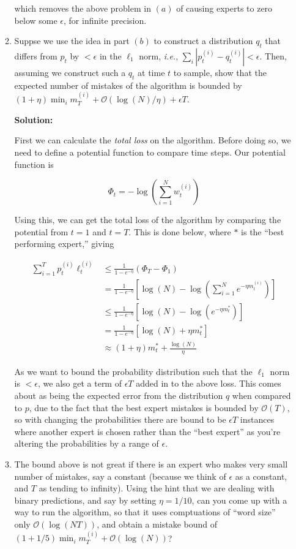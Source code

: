 \documentclass[12pt]{article}
\newcommand{\abs}[1]{\left| #1 \right|}
\newcommand{\BigO}[1]{\mathcal{O}\left( #1 \right)}
\begin{document}
\begin{enumerate}
\begin{enumerate}
which removes the above problem in $(a)$ of causing experts to zero below some $\epsilon$, for infinite precision. 


\item Suppse we use the idea in part $(b)$ to construct a distribution $q_{t}$ that differs from $p_{t}$ by $< \epsilon$ in the $\ell_{1}$ norm, {\em i.e.}, $\sum_{i}\abs{p_{t}^{(i)} - q_{t}^{(i)}} < \epsilon$. Then, assuming we construct such a $q_{t}$ at time $t$ to sample, show that the expected number of mistakes of the algorithm is bounded by $(1 + \eta)\min_{i}m_{T}^{(i)} + \BigO{\log(N)/\eta} + \epsilon T$.

      {\bf Solution:}

First we can calculate the {\em total loss} on the algorithm. Before doing so, we need to define a potential function to compare time steps. Our potential function is

\[
\Phi_{t} = -\log\left(\sum_{i=1}^{N}w_{t}^{(i)} \right) 
\]

Using this, we can get the total loss of the algorithm by comparing the potential from $t=1$ and $t=T$. This is done below, where $*$ is the ``best performing expert,'' giving

\begin{align*}
  \sum_{i=1}^{T} p_{t}^{(i)}\ell_{t}^{(i)} &\leq \frac{1}{1 - e^{-\eta}} \left( \Phi_{T} - \Phi_{1} \right)\\
  &= \frac{1}{1 - e^{-\eta}}\left[ \log(N) - \log\left( \sum_{i=1}^{N}e^{-\eta m_{t}^{(i)}}\right)\right]\\
 &\leq \frac{1}{1 - e^{-\eta}} \left[ \log(N) - \log\left( e^{-\eta m_{t}^{*}}\right)\right]\\
 &= \frac{1}{1 - e^{-\eta}}\left[ \log(N) + \eta m_{t}^{*} \right]\\
 &\approx (1 + \eta)m_{t}^{*} + \frac{\log(N)}{\eta}
\end{align*}

As we want to bound the probability distribution such that the $\ell_{1}$ norm is $< \epsilon$, we also get a term of $\epsilon T$ added in to the above loss. This comes about as being the expected error from the distribution $q$ when compared to $p$, due to the fact that the best expert mistakes is bounded by $\BigO{T}$, so with changing the probabilities there are bound to be $\epsilon T$ instances where another expert is chosen rather than the ``best expert'' as you're altering the probabilities by a range of $\epsilon$.


\item The bound above is not great if there is an expert who makes very small number of mistakes, say a constant (because we think of $\epsilon$ as a constant, and $T$ as tending to infinity). Using the hint that we are dealing with binary predictions, and say by setting $\eta = 1/10$, can you come up with a way to run the algorithm, so that it uses comptuations of ``word size'' only $\BigO{\log(NT)}$, and obtain a mistake bound of $(1 + 1/5)\min_{i} m_{T}^{(i)} + \BigO{\log(N)}$?


\end{enumerate}
\end{enumerate}
\end{document}
